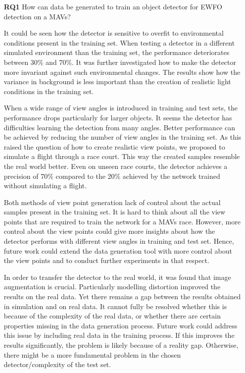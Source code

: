 \begin{enumerate}
	\item[\textbf{RQ1}]How can data be generated to train an object detector for \ac{EWFO} detection on a \acp{MAV}?
	
	It could be seen how the detector is sensitive to overfit to environmental conditions present in the training set. When testing a detector in a different simulated environment than the training set, the performance deteriorates between 30\% and 70\%. It was further investigated how to make the detector more invariant against such environmental changes. The results show how the variance in background is less important than the creation of realistic light conditions in the training set.
	
	When a wide range of view angles is introduced in training and test sets, the performance drops particularly for larger objects. It seems the detector has difficulties learning the detection from many angles. Better performance can be achieved by reducing the number of view angles in the training set. As this raised the question of how to create realistic view points, we proposed to simulate a flight through a race court. This way the created samples resemble the real world better. Even on unseen race courts, the detector achieves a precision of 70\% compared to the 20\% achieved by the network trained without simulating a flight. 
	
	Both methods of view point generation  lack of control about the actual samples present in the training set. It is hard to think about all the view points that are required to train the network for a \acp{MAV} race. However, more control about the view points could give more insights about how the detector performs with different view angles in training and test set. Hence, future work could extend the data generation tool with more control about the view points and to conduct further experiments in that respect.
		
	In order to transfer the detector to the real world, it was found that image augmentation is crucial. Particularly modelling distortion improved the results on the real data. Yet there remains a gap between the results obtained in simulation and on real data. It cannot fully be resolved whether this is because of the complexity of the real data, or whether there are certain properties missing in the data generation process. Future work could address this issue by including real data in the training process. If this improves the results significantly, the problem is likely because of a reality gap. Otherwise, there might be a more fundamental problem in the chosen detector/complexity of the test set.
	

\end{enumerate}
